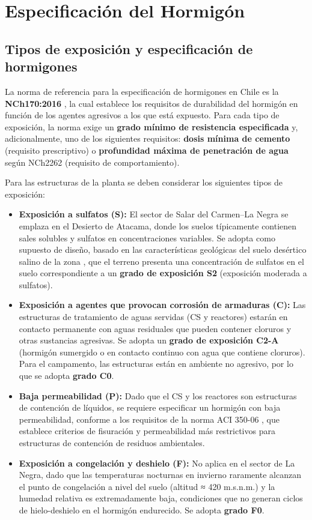 \section{Especificación del Hormigón}

\subsection{Tipos de exposición y especificación de hormigones}

La norma de referencia para la especificación de hormigones en Chile es la \textbf{NCh170:2016} \cite{NCh170}, la cual establece los requisitos de durabilidad del hormigón en función de los agentes agresivos a los que está expuesto. Para cada tipo de exposición, la norma exige un \textbf{grado mínimo de resistencia especificada} y, adicionalmente, uno de los siguientes requisitos: \textbf{dosis mínima de cemento} (requisito prescriptivo) o \textbf{profundidad máxima de penetración de agua} según NCh2262 (requisito de comportamiento).

Para las estructuras de la planta se deben considerar los siguientes tipos de exposición:

\begin{itemize}
    \item \textbf{Exposición a sulfatos (S):} El sector de Salar del Carmen--La Negra se emplaza en el Desierto de Atacama, donde los suelos típicamente contienen sales solubles y sulfatos en concentraciones variables. Se adopta como supuesto de diseño, basado en las características geológicas del suelo desértico salino de la zona \cite{CITAR_SUELO}, que el terreno presenta una concentración de sulfatos en el suelo correspondiente a un \textbf{grado de exposición S2} (exposición moderada a sulfatos).
    \item \textbf{Exposición a agentes que provocan corrosión de armaduras (C):} Las estructuras de tratamiento de aguas servidas (CS y reactores) estarán en contacto permanente con aguas residuales que pueden contener cloruros y otras sustancias agresivas. Se adopta un \textbf{grado de exposición C2-A} (hormigón sumergido o en contacto continuo con agua que contiene cloruros). Para el campamento, las estructuras están en ambiente no agresivo, por lo que se adopta \textbf{grado C0}.
    \item \textbf{Baja permeabilidad (P):} Dado que el CS y los reactores son estructuras de contención de líquidos, se requiere especificar un hormigón con baja permeabilidad, conforme a los requisitos de la norma ACI 350-06 \cite{ACI350}, que establece criterios de fisuración y permeabilidad más restrictivos para estructuras de contención de residuos ambientales.
    \item \textbf{Exposición a congelación y deshielo (F):} No aplica en el sector de La Negra, dado que las temperaturas nocturnas en invierno raramente alcanzan el punto de congelación a nivel del suelo (altitud ≈ 420 m.s.n.m.) y la humedad relativa es extremadamente baja, condiciones que no generan ciclos de hielo-deshielo en el hormigón endurecido. Se adopta \textbf{grado F0}.
\end{itemize}

